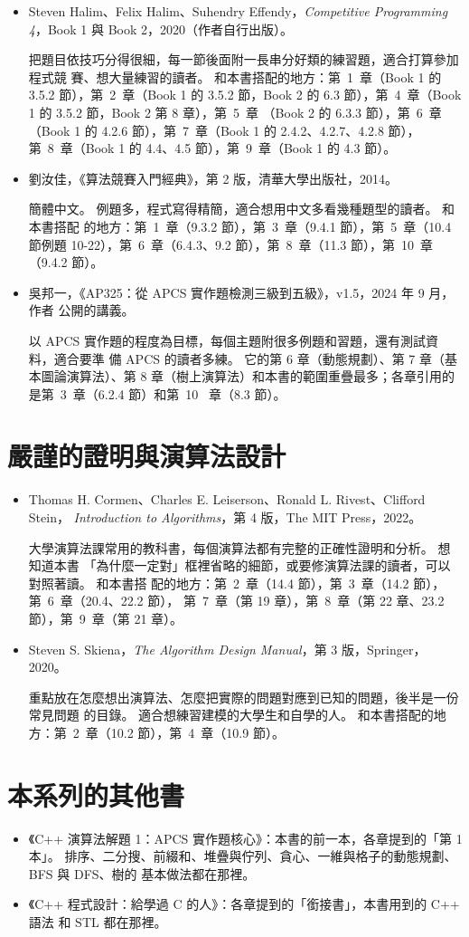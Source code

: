 \begin{itemize}
\item Steven Halim、Felix Halim、Suhendry Effendy，\textit{Competitive
Programming 4}，Book 1 與 Book 2，2020（作者自行出版）。

把題目依技巧分得很細，每一節後面附一長串分好類的練習題，適合打算參加程式競
賽、想大量練習的讀者。 和本書搭配的地方：第~1~章（Book 1 的 3.5.2 節），第~2~章（Book 1
的 3.5.2 節，Book 2 的 6.3 節），第~4~章（Book 1 的 3.5.2 節，Book 2 第 8 章），第~5~章
（Book 2 的 6.3.3 節），第~6~章（Book 1 的 4.2.6 節），第~7~章（Book 1 的
2.4.2、4.2.7、4.2.8 節），第~8~章（Book 1 的 4.4、4.5 節），第~9~章（Book 1
的 4.3 節）。

\item 劉汝佳，《算法競賽入門經典》，第 2 版，清華大學出版社，2014。

簡體中文。 例題多，程式寫得精簡，適合想用中文多看幾種題型的讀者。 和本書搭配
的地方：第~1~章（9.3.2 節），第~3~章（9.4.1 節），第~5~章（10.4 節例題
10-22），第~6~章（6.4.3、9.2 節），第~8~章（11.3 節），第~10~章（9.4.2 節）。

\item 吳邦一，《AP325：從 APCS 實作題檢測三級到五級》，v1.5，2024 年 9 月，作者
公開的講義。

以 APCS 實作題的程度為目標，每個主題附很多例題和習題，還有測試資料，適合要準
備 APCS 的讀者多練。 它的第 6 章（動態規劃）、第 7 章（基本圖論演算法）、第 8
章（樹上演算法）和本書的範圍重疊最多；各章引用的是第~3~章（6.2.4 節）和第~10~%
章（8.3 節）。
\end{itemize}

\section*{嚴謹的證明與演算法設計}

\begin{itemize}
\item Thomas H. Cormen、Charles E. Leiserson、Ronald L. Rivest、Clifford Stein，
\textit{Introduction to Algorithms}，第 4 版，The MIT Press，2022。

大學演算法課常用的教科書，每個演算法都有完整的正確性證明和分析。 想知道本書
「為什麼一定對」框裡省略的細節，或要修演算法課的讀者，可以對照著讀。 和本書搭
配的地方：第~2~章（14.4 節），第~3~章（14.2 節），第~6~章（20.4、22.2 節），
第~7~章（第 19 章），第~8~章（第 22 章、23.2 節），第~9~章（第 21 章）。

\item Steven S. Skiena，\textit{The Algorithm Design Manual}，第 3 版，Springer，
2020。

重點放在怎麼想出演算法、怎麼把實際的問題對應到已知的問題，後半是一份常見問題
的目錄。 適合想練習建模的大學生和自學的人。 和本書搭配的地方：第~2~章（10.2
節），第~4~章（10.9 節）。
\end{itemize}

\section*{本系列的其他書}

\begin{itemize}
\item 《C++ 演算法解題 1：APCS 實作題核心》：本書的前一本，各章提到的「第 1 本」。
排序、二分搜、前綴和、堆疊與佇列、貪心、一維與格子的動態規劃、BFS 與 DFS、樹的
基本做法都在那裡。
\item 《C++ 程式設計：給學過 C 的人》：各章提到的「銜接書」，本書用到的 C++ 語法
和 STL 都在那裡。
\end{itemize}
